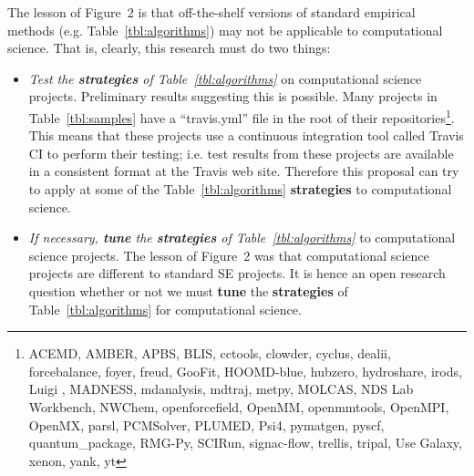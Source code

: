 \documentclass{NSF}
\newenvironment{myitemize}
{ \begin{itemize}
    \setlength{\itemsep}{0pt}
    \setlength{\parskip}{0pt}
    \setlength{\parsep}{0pt}     }
{ \end{itemize}                  }
\newcommand{\bi}{\begin{myitemize}}
\newcommand{\ei}{\end{myitemize}}
\newcommand{\tbl}[1]{Table~\ref{tbl:#1}}
\begin{document}
\begin{nsfdescription}
 
The 
  lesson of Figure~2 is that off-the-shelf versions of standard empirical methods (e.g. \tbl{algorithms}) may not be applicable to computational science. 
 That is, clearly, this research must do two things:
  \bi
  \item {\em Test the {\bf strategies} of \tbl{algorithms}} on   computational science  projects.
Preliminary results suggesting   this is possible.
  Many    projects   in \tbl{samples}
  have a ``travis.yml'' file in the root of their repositories\footnote{
ACEMD,
AMBER,
APBS,
BLIS,
cctools,
clowder,
cyclus,
dealii,
forcebalance,
foyer,
freud,
GooFit,
HOOMD-blue,
hubzero,
hydroshare,
irods,
Luigi ,
MADNESS,
mdanalysis,
mdtraj,
metpy,
MOLCAS,
NDS Lab Workbench,
NWChem,
openforcefield,
OpenMM,
openmmtools,
OpenMPI,
OpenMX,
parsl,
PCMSolver,
PLUMED,
Psi4,
pymatgen,
pyscf,
quantum\_package,
RMG-Py,
SCIRun,
signac-flow,
trellis,
tripal,
Use Galaxy,
xenon,
yank,
yt}.
This means that these projects use a continuous integration tool called Travis CI to perform their testing;
i.e. test results from these   projects are available in a consistent format at the Travis web site. Therefore this proposal
can try to  apply at  some of the \tbl{algorithms} {\bf strategies} to computational science.
\item
{\em If necessary, {\bf tune} the {\bf strategies} of \tbl{algorithms}} to computational science projects.
The lesson of Figure~2 was that computational science projects are different to
standard SE projects. It is hence an open research question whether or not
we must {\bf tune} the   {\bf strategies} of \tbl{algorithms} for computational science.
 \ei 
 
 
\begin{figure}[!t]


\end{figure}
\end{nsfdescription}
\end{document}

